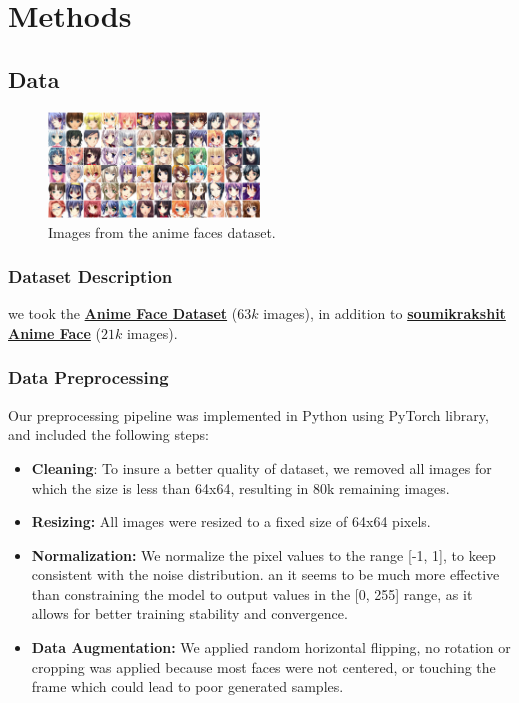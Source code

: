 \documentclass[twocolumn,superscriptaddress,aps]{revtex4-1}
\begin{document}
\section{Methods}
\subsection{Data}
\begin{figure}[htbp]
	\centering
	\includegraphics[width=0.5\textwidth]{figures/original_data_samples_grid.png}
	\caption{Images from the anime faces dataset.}
	\label{Figure 1: dataset}
\end{figure}
\subsubsection{Dataset Description}

we took the \href{https://www.kaggle.com/datasets/splcher/animefacedataset/}{\textbf{Anime Face Dataset}} ($63k$ images), in addition to \href{https://www.kaggle.com/datasets/soumikrakshit/anime-faces}{\textbf{soumikrakshit Anime Face}} ($21k$ images).


\subsubsection{Data Preprocessing}
Our preprocessing pipeline was implemented in Python using PyTorch library, and included the following steps:

\begin{itemize}
	\item \textbf{Cleaning}: To insure a better quality of dataset, we removed all images for which the size is less than 64x64, resulting in 80k remaining images.
	\item \textbf{Resizing:} All images were resized to a fixed size of 64x64 pixels.
	\item \textbf{Normalization:} We normalize the pixel values to the range [-1, 1], to keep consistent with the noise distribution. an it seems to be much more effective than constraining the model to output values in the [0, 255] range, as it allows for better training stability and convergence.
	\item \textbf{Data Augmentation:} We applied random horizontal flipping, no rotation or cropping was applied because most faces were not centered, or touching the frame which could lead to poor generated samples.
\end{itemize}
\end{document}
